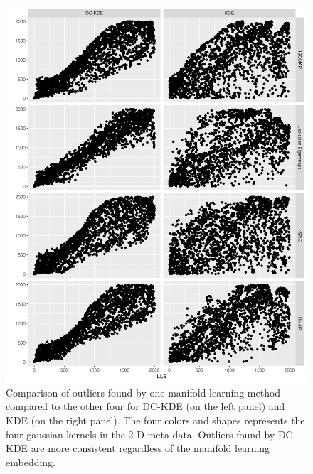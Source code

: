 \documentclass[11pt,a4paper,]{article}
\begin{document}
\begin{figure}

{\centering \includegraphics[width=0.95\linewidth]{figures/Twin Peak2000_density_compare_llevs4ml_radius8_r0_5_rank} 

}

\caption{Comparison of outliers found by one manifold learning method compared to the other four for DC-KDE (on the left panel) and KDE (on the right panel). The four colors and shapes represents the four gaussian kernels in the 2-D meta data. Outliers found by DC-KDE are more consistent regardless of the manifold learning embedding.}\label{fig:tpllevs4ml-1}
\end{figure}
\end{document}
